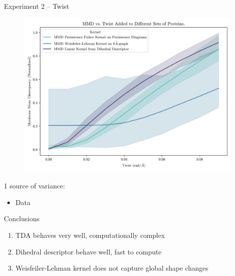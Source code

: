 \documentclass[aspectratio=169, 10pt, dvipsnames]{beamer}
\begin{document}
  {
\begin{frame}[fragile]{Experiment 2 -- Twist}
  \begin{minipage}{0.6\linewidth}
    \begin{figure}
      \centering
      \includegraphics[width=\textwidth]{./figures/twist.png}
    \end{figure}
  \end{minipage}
  \begin{minipage}{0.38\linewidth}

    \pause\small 1 source of variance:
    \begin{itemize}
      \pause\small\item Data
  \end{itemize}

  \begin{alert}{Conclusions}
    \begin{enumerate}
      \pause\item TDA behaves very well, computationally complex
      \pause\item Dihedral descriptor behave well, fast to compute
      \pause\item Weisfeiler-Lehman kernel does not capture global shape changes
    \end{enumerate}
  \end{alert}
  \end{minipage}
\end{frame}
}
\end{document}
